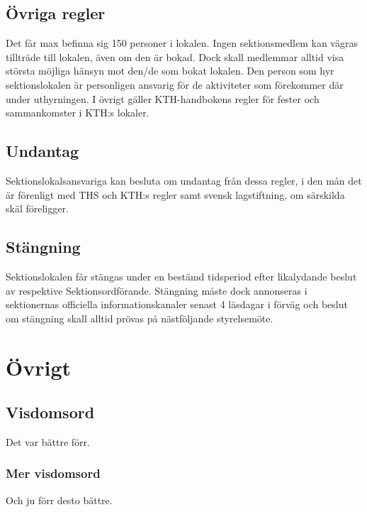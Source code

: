 \documentclass{dgovdoc}
\begin{document}
\subsection{Övriga regler}

Det får max befinna sig 150 personer i lokalen. Ingen sektionsmedlem kan vägras
tillträde till lokalen, även om den är bokad. Dock skall medlemmar alltid visa
största möjliga hänsyn mot den/de som bokat lokalen. Den person som hyr
sektionslokalen är personligen ansvarig för de aktiviteter som förekommer där
under uthyrningen. I övrigt gäller KTH-handbokens regler för fester och
sammankomster i KTH:s lokaler.

\subsection{Undantag}

Sektionslokalsansvariga kan besluta om undantag från dessa regler, i den mån
det är förenligt med THS och KTH:s regler samt svensk lagstiftning, om
särskilda skäl föreligger.

\subsection{Stängning}
\label{sec:sektionslokal-stangning}

Sektionslokalen får stängas under en bestämd tidsperiod efter likalydande
beslut av respektive Sektionsordförande. Stängning måste dock annonseras i
sektionernas officiella informationskanaler senast 4 läsdagar i förväg och
beslut om stängning skall alltid prövas på nästföljande styrelsemöte.

\section{Övrigt}

\subsection{Visdomsord}

Det var bättre förr.

\subsubsection{Mer visdomsord}

Och ju förr desto bättre.
\end{document}
